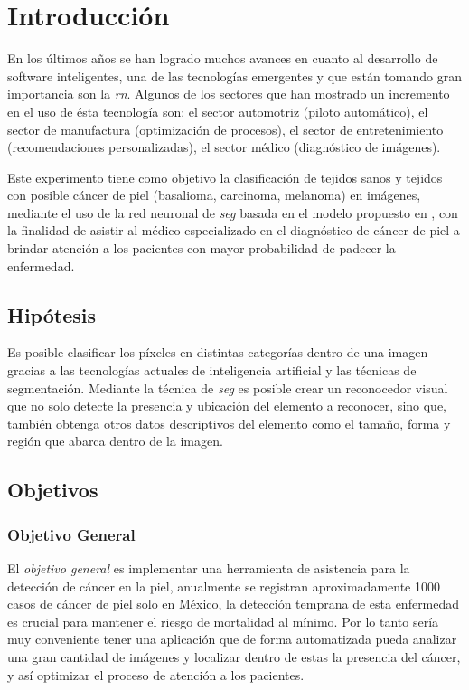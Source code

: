 
\chapter{Introducción}

En los últimos años se han logrado muchos avances en cuanto al desarrollo de software inteligentes, una de las tecnologías emergentes y que están tomando gran importancia son la \emph{\gls{rn}}. Algunos de los sectores que han mostrado un incremento en el uso de ésta tecnología son: el sector automotriz (piloto automático), el sector de manufactura (optimización de procesos), el sector de entretenimiento (recomendaciones personalizadas), el sector médico (diagnóstico de imágenes). 

Este experimento tiene como objetivo la clasificación de tejidos sanos y tejidos con posible cáncer de piel (basalioma, carcinoma, melanoma) en imágenes, mediante el uso de la red neuronal de \emph{\gls{seg}} basada en el modelo propuesto en \cite{wu2019fastfcn}, con la finalidad de asistir al médico especializado en el diagnóstico de cáncer de piel a brindar atención a los pacientes con mayor probabilidad de padecer la enfermedad.

\newpage

\section{Hipótesis}
Es posible clasificar los píxeles en distintas categorías dentro de una imagen gracias a las tecnologías actuales de inteligencia artificial y las técnicas de segmentación. Mediante la técnica de \emph{\gls{seg}} es posible crear un reconocedor visual que no solo detecte la presencia y ubicación del elemento a reconocer, sino que, también obtenga otros datos descriptivos del elemento como el tamaño, forma y región que abarca dentro de la imagen. 

\section{Objetivos}
\subsection{Objetivo General}
El \emph{objetivo general} es implementar una herramienta de asistencia  para la detección de cáncer en la piel,  anualmente se registran aproximadamente 1000 casos de cáncer de piel solo en México, la detección temprana de esta enfermedad es crucial para mantener el riesgo de mortalidad al mínimo. Por lo tanto sería muy conveniente tener una aplicación que de forma automatizada pueda analizar una gran cantidad de imágenes y localizar dentro de estas la presencia del cáncer, y así optimizar el proceso de atención a los pacientes.
